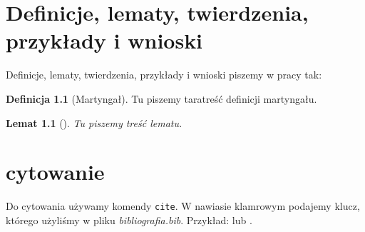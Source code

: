 \documentclass[inzynierska]{pwr_wmat_praca_dyplomowa}
\theoremstyle{plain}
\numberwithin{theorem}{chapter}
\newtheorem{lemma}[theorem]{Lemat}
\theoremstyle{definition}
\numberwithin{theorem}{chapter}
\newtheorem{definition}[theorem]{Definicja}
\begin{document}
\chapter{Definicje, lematy, twierdzenia, przykłady i wnioski}
Definicje, lematy, twierdzenia, przykłady i wnioski piszemy w pracy tak:
\begin{definition}[Martyngał]
	Tu piszemy taratreść definicji martyngału.
\end{definition}
\begin{lemma}[]%
	Tu piszemy treść lematu.
\end{lemma}
\chapter{cytowanie}
Do cytowania używamy komendy \texttt{cite}. W nawiasie klamrowym podajemy klucz, którego użyliśmy w pliku \emph{bibliografia.bib}. Przykład: \cite{einstein} lub \cite[chap. 2]{latexcompanion}.




\newpage
 
\end{document}
